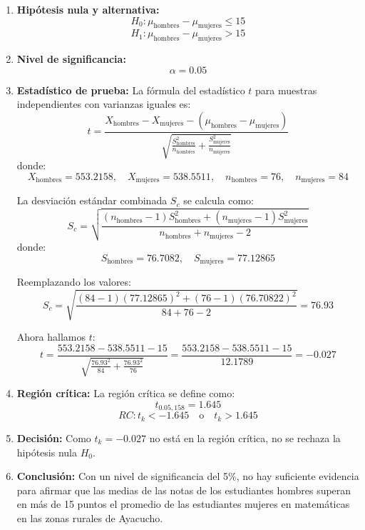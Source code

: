 \documentclass[
]{article}
\begin{document}
\begin{enumerate}
  \item \textbf{Hipótesis nula y alternativa:}
    \[
    H_0: \mu_{\text{hombres}} - \mu_{\text{mujeres}} \leq 15
    \]
    \[
    H_1: \mu_{\text{hombres}} - \mu_{\text{mujeres}} > 15
    \]
    
  \item \textbf{Nivel de significancia:}
    \[
    \alpha = 0.05
    \]
    
  \item \textbf{Estadístico de prueba:}
    La fórmula del estadístico \( t \) para muestras independientes con varianzas iguales es:
    \[
    t = \frac{X_{\text{hombres}} - X_{\text{mujeres}} - (\mu_{\text{hombres}} - \mu_{\text{mujeres}})}{\sqrt{\frac{S_{\text{hombres}}^2}{n_{\text{hombres}}} + \frac{S_{\text{mujeres}}^2}{n_{\text{mujeres}}}}}
    \]
    donde:
    \[
    X_{\text{hombres}} = 553.2158, \quad X_{\text{mujeres}} = 538.5511, \quad n_{\text{hombres}} = 76, \quad n_{\text{mujeres}} = 84
    \]

  La desviación estándar combinada \( S_c \) se calcula como:
    \[
    S_c = \sqrt{\frac{(n_{\text{hombres}} - 1) S_{\text{hombres}}^2 + (n_{\text{mujeres}} - 1) S_{\text{mujeres}}^2}{n_{\text{hombres}} + n_{\text{mujeres}} - 2}}
    \]
    donde:
    \[
    S_{\text{hombres}} = 76.7082, \quad S_{\text{mujeres}} = 77.12865
    \]

  Reemplazando los valores:
    \[
    S_c = \sqrt{\frac{(84 - 1) (77.12865)^2 + (76 - 1) (76.70822)^2}{84 + 76 - 2}} = 76.93
    \]

  Ahora hallamos \( t \):
    \[
    t = \frac{553.2158 - 538.5511 - 15}{\sqrt{\frac{76.93^2}{84} + \frac{76.93^2}{76}}} = \frac{553.2158 - 538.5511 - 15}{12.1789} = -0.027
    \]

  \item \textbf{Región crítica:}
    La región crítica se define como:
    \[
    t_{0.05, 158} = 1.645
    \]
    \[
    RC: t_k < -1.645 \quad \text{o} \quad t_k > 1.645
    \]

  \item \textbf{Decisión:}
    Como \( t_k = -0.027 \) no está en la región crítica, no se rechaza la hipótesis nula \( H_0 \).

  \item \textbf{Conclusión:}
    Con un nivel de significancia del 5\%, no hay suficiente evidencia para afirmar que las medias de las notas de los estudiantes hombres superan en más de 15 puntos el promedio de las estudiantes mujeres en matemáticas en las zonas rurales de Ayacucho.
\end{enumerate}
\end{document}
